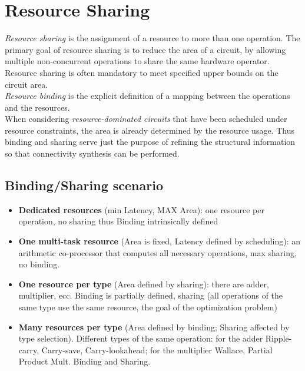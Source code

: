 \section{Resource Sharing}
\textit{Resource sharing}  is the assignment of a resource to more than one operation. The primary goal of resource sharing is to reduce the area of a circuit, by allowing multiple non-concurrent operations to share the same hardware operator. Resource sharing is often mandatory to meet specified upper bounds on the circuit area.\\
\textit{Resource  binding}  is the explicit definition of a mapping between the operations and the resources.\\
When considering \textit{resource-dominated circuits} that have been scheduled under resource constraints, the area is already determined by the resource usage. Thus binding and sharing serve just the purpose of refining the structural information so that connectivity synthesis can be performed.
\subsection{Binding/Sharing scenario}
\begin{itemize}
\item  \textbf{Dedicated resources} (min Latency, MAX Area): one resource per operation, no sharing thus Binding intrinsically defined
\item  \textbf{One multi-task resource} (Area is fixed, Latency defined by scheduling): an arithmetic co-processor that computes all necessary operations, max sharing, no binding.
\item  \textbf{One resource per type} (Area defined by sharing): there are adder, multiplier, ecc. Binding is partially defined, sharing (all operations of the same type use the same resource, the goal of the optimization problem)
\item \textbf{Many resources per type} (Area defined by binding; Sharing affected by type selection). Different types of the same operation: for the adder Ripple-carry, Carry-save, Carry-lookahead; for the multiplier Wallace, Partial Product Mult. Binding and Sharing.
\end{itemize}

